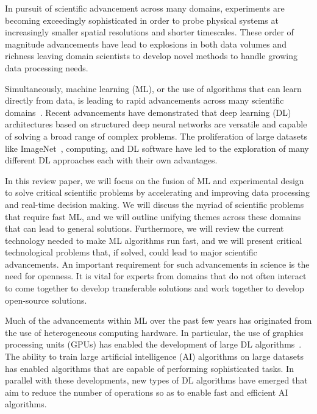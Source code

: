 In pursuit of scientific advancement across many domains, experiments are becoming exceedingly sophisticated in order to probe physical systems at increasingly smaller spatial resolutions and shorter timescales.  
These order of magnitude advancements have lead to explosions in both data volumes and richness leaving domain scientists to develop novel methods to handle growing data processing needs.  

Simultaneously, machine learning (ML), or the use of algorithms that can learn directly from data, is leading to rapid advancements across many scientific domains~\cite{Carleo:2019ptp}. 
Recent advancements have demonstrated that deep learning (DL) architectures based on structured deep neural networks are versatile and capable of solving a broad range of complex problems. 
The proliferation of large datasets like ImageNet~\cite{imagenet}, computing, and DL software have led to the exploration of many different DL approaches each with their own advantages. 

In this review paper, we will focus on the fusion of ML and experimental design to solve critical scientific problems by accelerating and improving data processing and real-time decision making. 
We will discuss the myriad of scientific problems that require fast ML, and we will outline unifying themes across these domains that can lead to general solutions. 
Furthermore, we will review the current technology needed to make ML algorithms run fast, and we will present critical technological problems that, if solved, could lead to major scientific advancements. 
An important requirement for such advancements in science is the need for openness.  
It is vital for experts from domains that do not often interact to come together to develop transferable solutions and work together to develop open-source solutions.  

Much of the advancements within ML over the past few years has originated from the use of heterogeneous computing hardware. 
In particular, the use of graphics processing units (GPUs) has enabled the development of large DL algorithms~\cite{gpus1,gpus2,gpus3}.  
The ability to train large artificial intelligence (AI) algorithms on large datasets has enabled algorithms that are capable of performing sophisticated tasks. 
In parallel with these developments, new types of DL algorithms have emerged that aim to reduce the number of operations so as to enable fast and efficient AI algorithms. 

